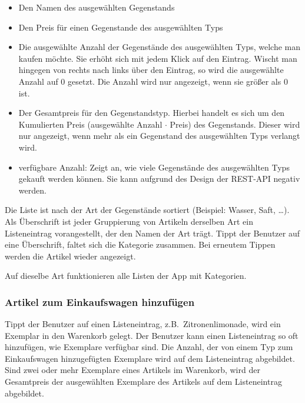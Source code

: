 \begin{itemize}
	\item Den Namen des ausgewählten Gegenstands

	\item Den Preis für einen Gegenstande des ausgewählten Typs

	\item Die ausgewählte Anzahl der Gegenstände des ausgewählten Typs, welche man kaufen möchte.
	Sie erhöht sich mit jedem Klick auf den Eintrag.
	Wischt man hingegen von rechts nach links über den Eintrag, so wird die ausgewählte Anzahl auf 0 gesetzt.
	Die Anzahl wird nur angezeigt, wenn sie größer als 0 ist.

	\item Der Gesamtpreis für den Gegenstandstyp.
	Hierbei handelt es sich um den Kumulierten Preis (ausgewählte Anzahl $\cdot$ Preis) des Gegenstands.
	Dieser wird nur angezeigt, wenn mehr als ein Gegenstand des ausgewählten Typs verlangt wird.

	\item verfügbare Anzahl: Zeigt an, wie viele Gegenstände des ausgewählten Typs gekauft werden können.
	Sie kann aufgrund des Design der REST-API negativ werden.
\end{itemize}

Die Liste ist nach der Art der Gegenstände sortiert (Beispiel: Wasser, Saft, \ldots).
Als Überschrift ist jeder Gruppierung von Artikeln derselben Art ein Listeneintrag vorangestellt, der den Namen der Art trägt.
Tippt der Benutzer auf eine Überschrift, faltet sich die Kategorie zusammen.
Bei erneutem Tippen werden die Artikel wieder angezeigt.

Auf dieselbe Art funktionieren alle Listen der App mit Kategorien.

\subsubsection{Artikel zum Einkaufswagen hinzufügen} \label{subsubsec:shoppingcart-add-item}

Tippt der Benutzer auf einen Listeneintrag, z.B.\ Zitronenlimonade, wird ein Exemplar in den Warenkorb gelegt.
Der Benutzer kann einen Listeneintrag so oft hinzufügen, wie Exemplare verfügbar sind.
Die Anzahl, der von einem Typ zum Einkaufswagen hinzugefügten Exemplare wird auf dem Listeneintrag abgebildet.
Sind zwei oder mehr Exemplare eines Artikels im Warenkorb, wird der Gesamtpreis der ausgewählten Exemplare des Artikels auf dem Listeneintrag abgebildet.

